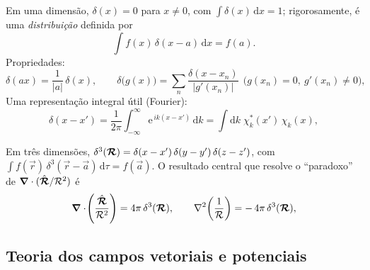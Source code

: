 Em uma dimensão, $\delta(x)=0$ para $x\neq0$, com $\int\delta(x)\,\mathrm{d}x=1$;
rigorosamente, é uma \emph{distribuição} definida por
\begin{equation}
  \int f(x)\,\delta(x-a)\,\mathrm{d}x=f(a).
\end{equation}
Propriedades:
\begin{equation}
  \delta(ax)=\frac{1}{|a|}\,\delta(x),\qquad
  \delta\big(g(x)\big)=\sum_{n}\frac{\delta(x-x_n)}{|g'(x_n)|}
  \ \ \big(g(x_n)=0,\ g'(x_n)\neq0\big),
\end{equation}
Uma representação integral útil (Fourier):
\begin{equation}
  \delta(x-x')=\frac{1}{2\pi}\int_{-\infty}^{\infty}\mathrm{e}^{\,ik(x-x')}\,\mathrm{d}k
             =\int \mathrm{d}k\;\chi_k^{*}(x')\,\chi_k(x),
\end{equation}

Em três dimensões, $\delta^{3}(\bm{\mathcal{R}})=\delta(x-x')\,\delta(y-y')\,\delta(z-z')$,
com $\int f(\vec{r})\,\delta^{3}(\vec{r}-\vec{a})\,\mathrm{d}\tau=f(\vec{a})$.
O resultado central que resolve o ``paradoxo'' de $\bm{\nabla}\cdot(\hat{\bm{\mathcal{R}}}/\mathcal{R}^2)$ é
\begin{equation}
  \bm{\nabla}\cdot\!\left(\frac{\hat{\bm{\mathcal{R}}}}{\mathcal{R}^{2}}\right)=4\pi\,\delta^{3}(\bm{\mathcal{R}}),
  \qquad
  \nabla^{2}\!\left(\frac{1}{\mathcal{R}}\right)=-\,4\pi\,\delta^{3}(\bm{\mathcal{R}}),
  \label{eq:delta3}
\end{equation}

\subsection{Teoria dos campos vetoriais e potenciais}

